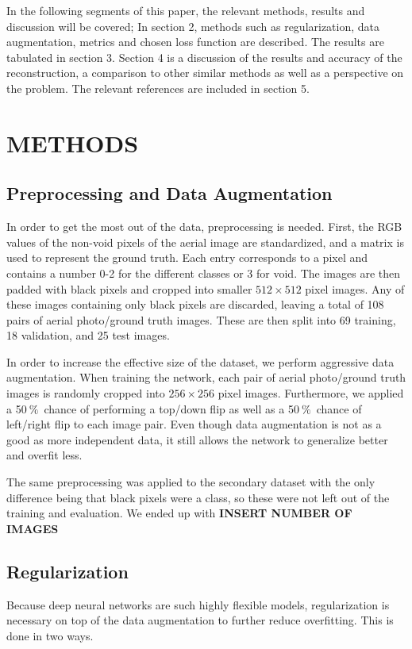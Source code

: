 \documentclass{article}
\newcommand{\pro}{\ensuremath{\ \%}}
\begin{document}
In the following segments of this paper, the relevant methods, results and discussion will be covered; In section 2, methods such as regularization, data augmentation, metrics and chosen loss function are described. The results are tabulated in section 3. Section 4 is a discussion of the results and accuracy of the reconstruction, a comparison to other similar methods as well as a perspective on the problem. The relevant references are included in section 5.

\section{METHODS}
\label{sec:format}

\subsection{Preprocessing and Data Augmentation}
In order to get the most out of the data, preprocessing is needed.
First, the RGB values of the non-void pixels of the aerial image are standardized, and a matrix is used to represent the ground truth.
Each entry corresponds to a pixel and contains a number 0-2 for the different classes or 3 for void.
The images are then padded with black pixels and cropped into smaller $ 512\times 512 $ pixel images.
Any of these images containing only black pixels are discarded, leaving a total of 108 pairs of aerial photo/ground truth images.
These are then split into 69 training, 18 validation, and 25 test images.

In order to increase the effective size of the dataset, we perform aggressive data augmentation.
When training the network, each pair of aerial photo/ground truth images is randomly cropped into $ 256\times 256 $ pixel images.
Furthermore, we applied a 50\pro\ chance of performing a top/down flip as well as a 50\pro\ chance of left/right flip to each image pair.
Even though data augmentation is not as a good as more independent data, it still allows the network to generalize better and overfit less.

The same preprocessing was applied to the secondary dataset with the only difference being that black pixels were a class, so these were not left out of the training and evaluation.
We ended up with \textbf{INSERT NUMBER OF IMAGES}

\subsection{Regularization}
Because deep neural networks are such highly flexible models, regularization is necessary on top of the data augmentation to further reduce overfitting.
This is done in two ways.
\end{document}
